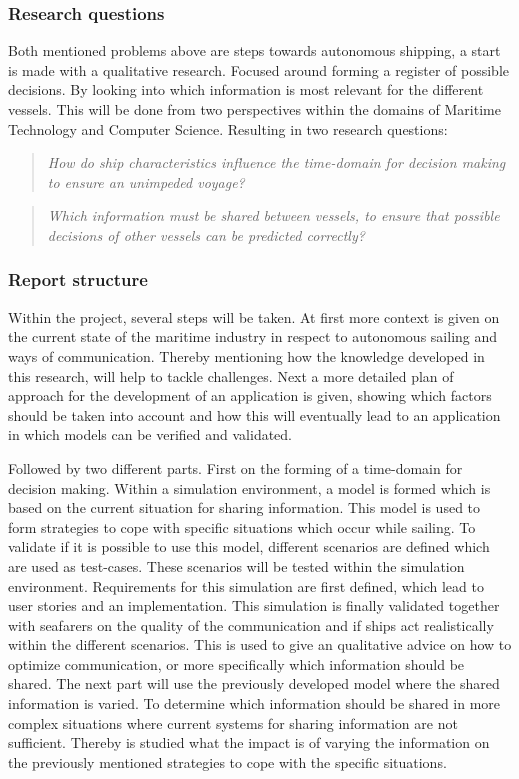 
\subsubsection*{Research questions}
Both mentioned problems above are steps towards autonomous shipping, a start is made with a qualitative research. Focused around forming a register of possible decisions. By looking into which information is most relevant for the different vessels. This will be done from two perspectives within the domains of Maritime Technology and Computer Science. Resulting in two research questions:

\begin{quotation}
	\emph{How do ship characteristics influence the time-domain for decision making to ensure an unimpeded voyage?} 
\end{quotation}

\begin{quotation}
	\emph{Which information must be shared between vessels, to ensure that possible decisions of other vessels can be predicted correctly?}
\end{quotation}

\subsubsection*{Report structure}
Within the project, several steps will be taken. At first more context is given on the current state of the maritime industry in respect to autonomous sailing and ways of communication. Thereby mentioning how the knowledge developed in this research, will help to tackle challenges.
Next a more detailed plan of approach for the development of an application is given, showing which factors should be taken into account and how this will eventually lead to an application in which models can be verified and validated.

Followed by two different parts. First on the forming of a time-domain for decision making. Within a simulation environment, a model is formed which is based on the current situation for sharing information. This model is used to form strategies to cope with specific situations which occur while sailing. To validate if it is possible to use this model, different scenarios are defined which are used as test-cases. These scenarios will be tested within the simulation environment. Requirements for this simulation are first defined, which lead to user stories and an implementation.
This simulation is finally validated together with seafarers on the quality of the communication and if ships act realistically within the different scenarios. This is used to give an qualitative advice on how to optimize communication, or more specifically which information should be shared.
The next part will use the previously developed model where the shared information is varied. To determine which information should be shared in more complex situations where current systems for sharing information are not sufficient. Thereby is studied what the impact is of varying the information on the previously mentioned strategies to cope with the specific situations.
